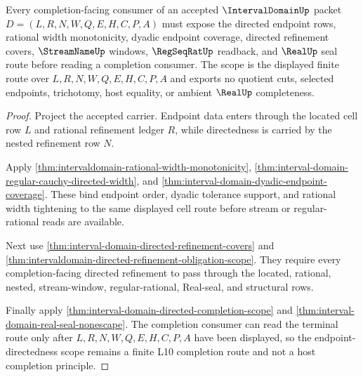 \begin{theorem}
\label{thm:interval-domain-endpoint-directedness-scope}
Every completion-facing consumer of an accepted $\IntervalDomainUp$ packet $D=(L,R,N,W,Q,E,H,C,P,A)$ must expose the directed endpoint rows, rational width monotonicity, dyadic endpoint coverage, directed refinement covers, $\StreamNameUp$ windows, $\RegSeqRatUp$ readback, and $\RealUp$ seal route before reading a completion consumer. The scope is the displayed finite route over $L,R,N,W,Q,E,H,C,P,A$ and exports no quotient cuts, selected endpoints, trichotomy, host equality, or ambient $\RealUp$ completeness.
\end{theorem}
\begin{proof}
Project the accepted carrier. Endpoint data enters through the located cell row $L$ and rational refinement ledger $R$, while directedness is carried by the nested refinement row $N$.

Apply \autoref{thm:intervaldomain-rational-width-monotonicity}, \autoref{thm:interval-domain-regular-cauchy-directed-width}, and \autoref{thm:interval-domain-dyadic-endpoint-coverage}. These bind endpoint order, dyadic tolerance support, and rational width tightening to the same displayed cell route before stream or regular-rational reads are available.

Next use \autoref{thm:interval-domain-directed-refinement-covers} and \autoref{thm:intervaldomain-directed-refinement-obligation-scope}. They require every completion-facing directed refinement to pass through the located, rational, nested, stream-window, regular-rational, Real-seal, and structural rows.

Finally apply \autoref{thm:interval-domain-directed-completion-scope} and \autoref{thm:interval-domain-real-seal-nonescape}. The completion consumer can read the terminal route only after $L,R,N,W,Q,E,H,C,P,A$ have been displayed, so the endpoint-directedness scope remains a finite L10 completion route and not a host completion principle.
\end{proof}

